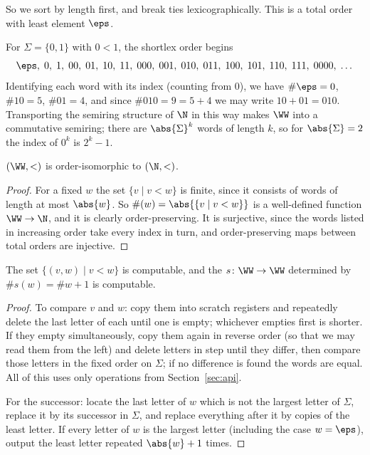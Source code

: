 So we sort by length first, and break ties lexicographically. This is a total order with least element $\eps$.

\begin{example}
	For $\Sigma = \{0,1\}$ with $0 < 1$, the shortlex order begins
	$$\eps,\; 0,\; 1,\; 00,\; 01,\; 10,\; 11,\; 000,\; 001,\; 010,\; 011,\; 100,\; 101,\; 110,\; 111,\; 0000,\; \dots$$
	Identifying each word with its index (counting from $0$), we have $\#\eps = 0$, $\#10 = 5$, $\#01 = 4$, and since $\#010 = 9 = 5 + 4$ we may write $10 + 01 = 010$. Transporting the semiring structure of $\N$ in this way makes $\WW$ into a commutative semiring; there are $\abs{\Sigma}^k$ words of length $k$, so for $\abs{\Sigma}=2$ the index of $0^k$ is $2^k - 1$.
\end{example}

\begin{theorem}
	$(\WW, <)$ is order-isomorphic to $(\N,<)$.
\end{theorem}

\begin{proof}
	For a fixed $w$ the set $\{v \mid v < w\}$ is finite, since it consists of words of length at most $\abs{w}$. So $\#(w) = \abs{\{v \mid v< w\}}$ is a well-defined function $\WW\to\N$, and it is clearly order-preserving. It is surjective, since the words listed in increasing order take every index in turn, and order-preserving maps between total orders are injective.
\end{proof}

\begin{theorem}\label{thm:successorcomputable}
	The set $\{(v,w) \mid v < w\}$ is computable, and the  $s \colon \WW \to \WW$ determined by $\#s(w) = \#w + 1$ is computable.
\end{theorem}

\begin{proof}
	To compare $v$ and $w$: copy them into scratch registers and repeatedly delete the last letter of each until one is empty; whichever empties first is shorter. If they empty simultaneously, copy them again in reverse order (so that we may read them from the left) and delete letters in step until they differ, then compare those letters in the fixed order on $\Sigma$; if no difference is found the words are equal. All of this uses only operations from Section~\ref{sec:api}.

	For the successor: locate the last letter of $w$ which is not the largest letter of $\Sigma$, replace it by its successor in $\Sigma$, and replace everything after it by copies of the least letter. If every letter of $w$ is the largest letter (including the case $w = \eps$), output the least letter repeated $\abs{w}+1$ times.
\end{proof}

